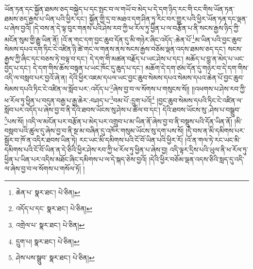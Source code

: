 ཡོན་ཏན་དང་སྐྱོན་ཐམས་ཅད་བསྐྱེད་པ་དང་སྤང་བ་ལ་གཡོ་བ་མེད་པ་དེ་དག་ཉིད་རང་གི་ངང་གིས་ཡོན་ཏན་ཐམས་ཅད་རྒྱས་པ་ཡིན་པའི་ཕྱིར་དང་། སྐྱོན་གྱི་དྲ་བ་མཐའ་དག་ཤིན་ཏུ་རིང་བར་གྱུར་པའི་ཕྱིར་ཡོན་ཏན་དང་ལྡན་པ་ཞེས་བྱའོ། །དེ་བས་ན་དེ་ལྟ་བུར་གནས་པའི་ཤེས་རབ་ཀྱི་ཕ་རོལ་ཏུ་ཕྱིན་པ་ལ་བརྩོན་པ་ནི་སངས་རྒྱས་ཉིད་ཀྱི་མངོན་སུམ་གྱི་རྒྱུ་ཡིན་ནོ། །འོ་ན་གང་དག་བྱང་ཆུབ་དོན་དུ་མི་གཉེར་ཞིང་འདོད་:ཆེན་པོ་\footnote{ཆེན་པ་  སྣར་ཐང་།  པེ་ཅིན། }མ་ཡིན་པའི་བྱང་ཆུབ་སེམས་དཔའ་དག་ཏིང་ངེ་འཛིན་ཉི་ཚེ་གང་ལ་གནས་ནས་སངས་རྒྱས་བཅོམ་ལྡན་འདས་ཐམས་ཅད་དང་། སངས་རྒྱས་ཀྱི་ཞིང་དང་བཅས་ཏེ་བལྟ་བ་དང་། དེ་དག་གི་མཚན་བརྗོད་པ་ཡང་ཤེས་པ་དང་། མཆོད་པ་བླ་ན་མེད་པ་ཡང་བྱེད་པ་དང་། དེ་དག་གིས་ཆོས་བསྟན་པ་ཡང་ཁོང་དུ་ཆུད་པ་དང་། མཆོག་དེ་དག་ཙམ་དོན་དུ་གཉེར་བ་དེ་དག་གིས་འདི་ལ་བསླབ་པར་བྱའོ་ཞེ་ན། དེའི་ཕྱིར་འཇམ་དཔལ་ཡང་བྱང་ཆུབ་སེམས་དཔའ་སེམས་དཔའ་ཆེན་པོ་བྱང་ཆུབ་སེམས་དཔའི་ཏིང་ངེ་འཛིན་ལ་སློབ་པར་:འདོད་པ་\footnote{འདོད་པ་དང་  སྣར་ཐང་།  པེ་ཅིན། }ཞེས་བྱ་བ་ལ་སོགས་པ་གསུངས་སོ།། །།འཕགས་པ་ཤེས་རབ་ཀྱི་ཕ་རོལ་ཏུ་ཕྱིན་པ་བདུན་བརྒྱ་པ་རྒྱ་ཆེར་:བཤད་པ་\footnote{འགྲེལ་པ་  སྣར་ཐང་།  པེ་ཅིན། }བམ་པོ་:དྲུག་པའོ།\footnote{དྲུག་པ།  སྣར་ཐང་།  པེ་ཅིན། } །བྱང་ཆུབ་སེམས་དཔའི་ཏིང་ངེ་འཛིན་ལ་སློབ་པར་འདོད་པ་ཞེས་བྱ་བ་ནི་དེའི་ཐབས་ཡོངས་སུ་ཤེས་པ་ཚོལ་བ་དང་། དེའི་ཐབས་ཡོངས་སུ་:ཤེས་པ་བསྒྲུབ་\footnote{ཤེས་པས་སྒྲུབ་  སྣར་ཐང་།  པེ་ཅིན། }པས་སོ། །འདི་ལ་མངོན་པར་བརྩོན་པ་མེད་པར་འགྲུབ་པ་མ་ཡིན་ནོ་ཞེས་བྱ་བ་ནི་བསྡུས་པའི་དོན་ཡིན་ནོ། །མི་བསླབ་པའི་ཚུལ་དུ་ཞེས་བྱ་བ་ནི་སྔ་མ་བཞིན་དུ་འཁོར་གསུམ་ཡོངས་སུ་དག་པས་སོ། །དེ་བས་ན་མི་དམིགས་པར་སྦྱོར་བ་ཁོ་ན་འདིར་ཐབས་ཡིན་ཏེ། རང་ཡང་མི་དམིགས་པའི་ངོ་བོ་ཡིན་པའི་ཕྱིར་རོ། །འོ་ན་གལ་ཏེ་རང་ཡང་མི་དམིགས་པའི་ངོ་བོ་ཡིན་ན་དེ་ཅིའི་ཕྱིར་ཤེས་རབ་ཀྱི་ཕ་རོལ་ཏུ་ཕྱིན་པ་ཞེས་བྱ། འདི་ལྟར་དྲིས་པའི་ཡུལ་ནི་ཕ་རོལ་ཏུ་ཕྱིན་པ་ཡིན་པར་འདིས་མཐོང་ཞིང་དམིགས་པ་ལ་དེ་སྐད་ཅེས་བྱའོ། །དེའི་ཕྱིར་བཅོམ་ལྡན་འདས་ཅིའི་སླད་དུ་འདི་ལ་ཞེས་བྱ་བ་ལ་སོགས་པ་གསོལ་ཏོ། །
